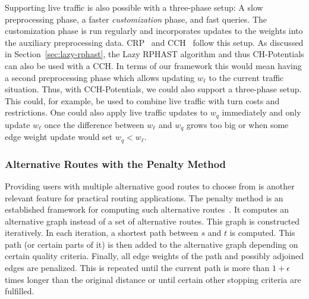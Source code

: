 \documentclass[a4paper,UKenglish,cleveref, autoref, thm-restate]{lipics-v2021}
\begin{document}
Supporting live traffic is also possible with a three-phase setup:
A slow preprocessing phase, a faster \emph{customization} phase, and fast queries.
The customization phase is run regularly and incorporates updates to the weights into the auxiliary preprocessing data.
CRP~\cite{dgpw-crprn-13} and CCH~\cite{dsw-cch-15} follow this setup.
As discussed in Section~\ref{sec:lazy-rphast}, the Lazy RPHAST algorithm and thus CH-Potentials can also be used with a CCH.
In terms of our framework this would mean having a second preprocessing phase which allows updating $w_\ell$ to the current traffic situation.
Thus, with CCH-Potentials, we could also support a three-phase setup.
This could, for example, be used to combine live traffic with turn costs and restrictions.
One could also apply live traffic updates to $w_q$ immediately and only update $w_\ell$ once the difference between $w_\ell$ and $w_q$ grows too big or when some edge weight update would set $w_q < w_\ell$.

\subsubsection{Alternative Routes with the Penalty Method}

Providing users with multiple alternative good routes to choose from is another relevant feature for practical routing applications.
The penalty method is an established framework for computing such alternative routes~\cite{bdgs-argrn-11,krs-eepma-13,pz-iarp-13,kobitzsch2015alternative}.
It computes an alternative graph instead of a set of alternative routes.
This graph is constructed iteratively.
In each iteration, a shortest path between $s$ and $t$ is computed.
This path (or certain parts of it) is then added to the alternative graph depending on certain quality criteria.
Finally, all edge weights of the path and possibly adjoined edges are penalized.
This is repeated until the current path is more than $1 + \epsilon$ times longer than the original distance or until certain other stopping criteria are fulfilled.
\end{document}

